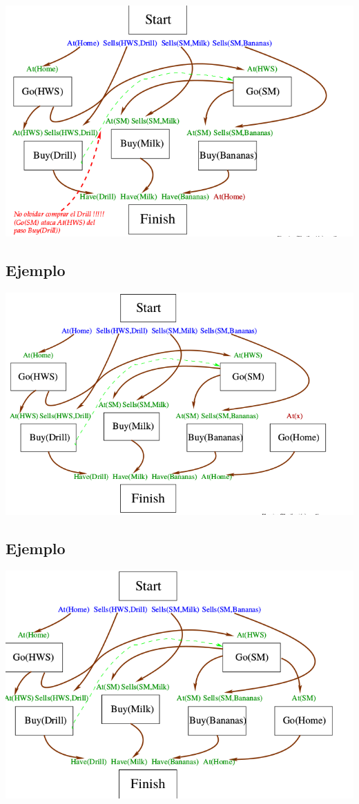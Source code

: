 \documentclass[11pt]{article}
\begin{document}
\begin{center}
\includegraphics[width=.9\linewidth]{imagenes/pop19.png}
\end{center}

\subsection*{Ejemplo}
\label{sec:orgf61fe6f}

\begin{center}
\includegraphics[width=.9\linewidth]{imagenes/pop20.png}
\end{center}

\subsection*{Ejemplo}
\label{sec:org2e1a46a}

\begin{center}
\includegraphics[width=.9\linewidth]{imagenes/pop21.png}
\end{center}
\end{document}
